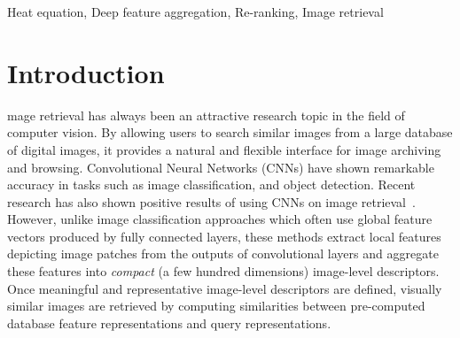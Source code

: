 \documentclass[journal]{IEEEtran}
\begin{document}
\begin{IEEEkeywords}
Heat equation, Deep feature aggregation, Re-ranking, Image retrieval
\end{IEEEkeywords}



\IEEEpeerreviewmaketitle


\section{Introduction}
mage retrieval has always been an attractive research topic in the field of computer vision.
By allowing users to search similar images from a large database of digital images,
it provides a natural and flexible interface for image archiving and browsing. Convolutional Neural  Networks (CNNs) have shown remarkable accuracy in tasks such as image classification, and object detection. Recent research has also shown positive results of using CNNs
on image retrieval~\cite{babenko2015aggregating,kalantidis2016cross,hoang2017selective, chadha2017voronoi, zhang2018query}. However, unlike image classification approaches which often use global feature vectors produced by fully connected layers, %
these methods extract local features depicting image patches from the outputs of convolutional layers and aggregate these features into \emph{compact} (a few hundred dimensions) image-level descriptors.
Once meaningful and representative image-level descriptors are defined, visually similar images are retrieved by computing similarities between pre-computed database feature representations and query representations.
\end{document}
